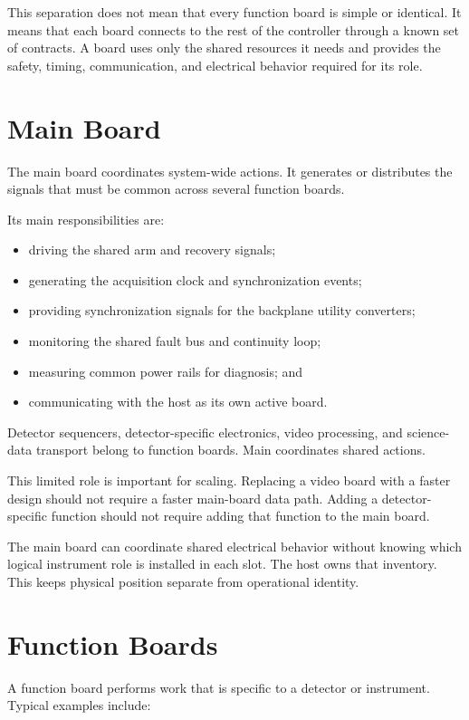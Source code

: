 This separation does not mean that every function board is simple or identical. It means that each board connects to the rest of the controller through a known set of contracts. A board uses only the shared resources it needs and provides the safety, timing, communication, and electrical behavior required for its role.

\section{Main Board}

The main board coordinates system-wide actions. It generates or distributes the signals that must be common across several function boards.

Its main responsibilities are:

\begin{itemize}
  \item driving the shared arm and recovery signals;
  \item generating the acquisition clock and synchronization events;
  \item providing synchronization signals for the backplane utility converters;
  \item monitoring the shared fault bus and continuity loop;
  \item measuring common power rails for diagnosis; and
  \item communicating with the host as its own active board.
\end{itemize}

Detector sequencers, detector-specific electronics, video processing, and science-data transport belong to function boards. Main coordinates shared actions.

This limited role is important for scaling. Replacing a video board with a faster design should not require a faster main-board data path. Adding a detector-specific function should not require adding that function to the main board.

The main board can coordinate shared electrical behavior without knowing which logical instrument role is installed in each slot. The host owns that inventory. This keeps physical position separate from operational identity.

\section{Function Boards}

A function board performs work that is specific to a detector or instrument. Typical examples include:


